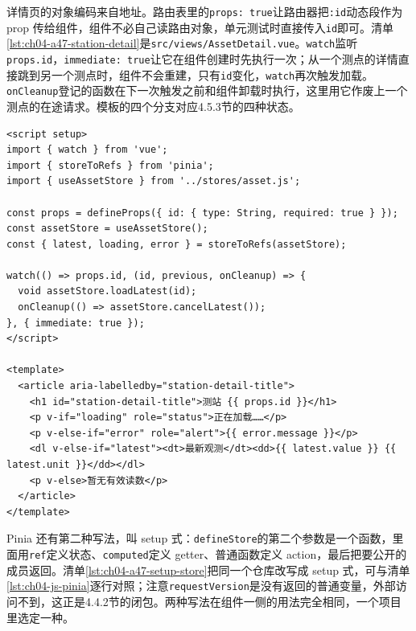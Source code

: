详情页的对象编码来自地址。路由表里的\texttt{props: true}让路由器把\texttt{:id}动态段作为 prop 传给组件，组件不必自己读路由对象，单元测试时直接传入\texttt{id}即可。清单\ref{lst:ch04-a47-station-detail}是\texttt{src/views/AssetDetail.vue}。\texttt{watch}监听\texttt{props.id}，\texttt{immediate: true}让它在组件创建时先执行一次；从一个测点的详情直接跳到另一个测点时，组件不会重建，只有\texttt{id}变化，\texttt{watch}再次触发加载。\texttt{onCleanup}登记的函数在下一次触发之前和组件卸载时执行，这里用它作废上一个测点的在途请求。模板的四个分支对应4.5.3节的四种状态。

\begin{lstlisting}[label={lst:ch04-a47-station-detail},language=Vue,caption={AssetDetail.vue 接收动态路由参数}]
<script setup>
import { watch } from 'vue';
import { storeToRefs } from 'pinia';
import { useAssetStore } from '../stores/asset.js';

const props = defineProps({ id: { type: String, required: true } });
const assetStore = useAssetStore();
const { latest, loading, error } = storeToRefs(assetStore);

watch(() => props.id, (id, previous, onCleanup) => {
  void assetStore.loadLatest(id);
  onCleanup(() => assetStore.cancelLatest());
}, { immediate: true });
</script>

<template>
  <article aria-labelledby="station-detail-title">
    <h1 id="station-detail-title">测站 {{ props.id }}</h1>
    <p v-if="loading" role="status">正在加载……</p>
    <p v-else-if="error" role="alert">{{ error.message }}</p>
    <dl v-else-if="latest"><dt>最新观测</dt><dd>{{ latest.value }} {{ latest.unit }}</dd></dl>
    <p v-else>暂无有效读数</p>
  </article>
</template>
\end{lstlisting}

Pinia 还有第二种写法，叫 setup 式：\texttt{defineStore}的第二个参数是一个函数，里面用\texttt{ref}定义状态、\texttt{computed}定义 getter、普通函数定义 action，最后把要公开的成员返回。清单\ref{lst:ch04-a47-setup-store}把同一个仓库改写成 setup 式，可与清单\ref{lst:ch04-js-pinia}逐行对照；注意\texttt{requestVersion}是没有返回的普通变量，外部访问不到，这正是4.4.2节的闭包。两种写法在组件一侧的用法完全相同，一个项目里选定一种。


